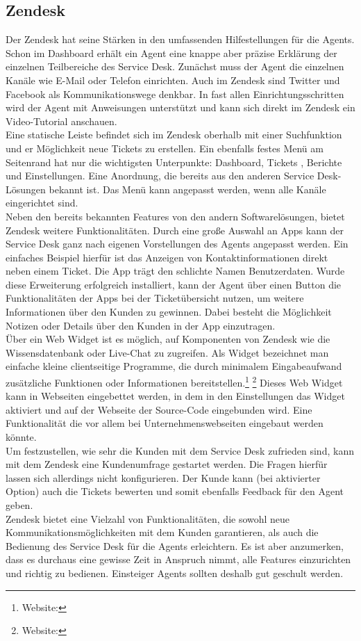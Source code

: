 \subsection{Zendesk}
\noindent 
Der Zendesk hat seine Stärken in den umfassenden Hilfestellungen für die Agents. Schon im Dashboard erhält ein Agent eine knappe aber präzise Erklärung der einzelnen Teilbereiche des Service Desk. Zunächst muss der Agent die einzelnen Kanäle wie E-Mail oder Telefon einrichten. Auch im Zendesk sind  Twitter und Facebook als Kommunikationswege denkbar. In fast allen Einrichtungsschritten wird der Agent mit Anweisungen unterstützt und kann sich direkt im Zendesk ein Video-Tutorial anschauen.\\
Eine statische Leiste befindet sich im Zendesk oberhalb mit einer Suchfunktion und er Möglichkeit neue Tickets zu erstellen. Ein ebenfalls festes Menü am Seitenrand hat nur die wichtigsten Unterpunkte: Dashboard, Tickets , Berichte und Einstellungen. Eine Anordnung, die bereits aus den anderen Service Desk-Lösungen bekannt ist. Das Menü kann angepasst werden, wenn alle Kanäle eingerichtet sind.\\
Neben den bereits bekannten Features von den andern Softwarelösungen, bietet Zendesk weitere Funktionalitäten. Durch eine große Auswahl an Apps kann der Service Desk ganz nach eigenen Vorstellungen des Agents angepasst werden. Ein einfaches Beispiel hierfür ist das Anzeigen von Kontaktinformationen direkt neben einem Ticket. Die App trägt den schlichte Namen Benutzerdaten. Wurde diese Erweiterung erfolgreich installiert, kann der Agent über einen Button die Funktionalitäten der Apps bei der Ticketübersicht nutzen,  um weitere Informationen über den Kunden zu gewinnen. Dabei besteht die Möglichkeit Notizen oder Details über den Kunden in der App einzutragen.\\
Über ein Web Widget ist es möglich, auf Komponenten von Zendesk wie die Wissensdatenbank oder Live-Chat zu zugreifen. Als Widget bezeichnet man einfache kleine clientseitige Programme, die durch minimalem Eingabeaufwand zusätzliche Funktionen oder Informationen bereitstellen.\footnote{Website:\cite{Widget1}} \footnote{Website:\cite{Widget2}} Dieses Web Widget kann in Webseiten eingebettet werden, in dem in den Einstellungen das Widget aktiviert und auf der Webseite der Source-Code eingebunden wird. Eine Funktionalität die vor allem bei Unternehmenswebseiten  eingebaut werden könnte.\\
Um festzustellen, wie sehr die Kunden mit dem Service Desk zufrieden sind, kann mit dem Zendesk eine Kundenumfrage gestartet werden. Die Fragen hierfür lassen sich allerdings nicht konfigurieren. Der Kunde kann (bei aktivierter Option) auch die Tickets bewerten und somit ebenfalls Feedback für den Agent geben.\\
Zendesk bietet eine Vielzahl von Funktionalitäten, die sowohl neue Kommunikationsmöglichkeiten mit dem Kunden garantieren, als auch die Bedienung des Service Desk für die Agents erleichtern. Es ist aber anzumerken, dass es durchaus eine gewisse Zeit in Anspruch nimmt, alle Features einzurichten und richtig zu bedienen. Einsteiger Agents sollten deshalb gut geschult werden.\\


